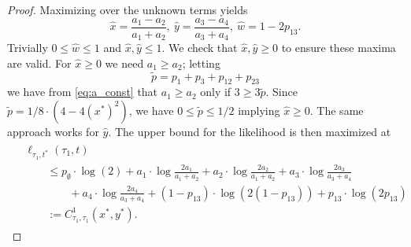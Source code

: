 \begin{proof}
Maximizing over the unknown terms yields
$$
\hat{x} = \frac{a_{1}-a_{2}}{a_{1}+a_{2}}, \ \hat{y} = \frac{a_{3}-a_{4}}{a_{3}+a_{4}}, \ \hat{w} = 1-2p_{13}.
$$
Trivially $0 \le \hat{w} \le 1$ and $\hat{x}, \hat{y} \le 1$.
We check that $\hat{x}, \hat{y} \ge 0$ to ensure these maxima are valid.
For $\hat{x} \ge 0$ we need $a_1 \ge a_2$; letting
$$
\tilde{p} = p_{1}+p_{3}+p_{12}+p_{23}
$$
we have from \eqref{eq:a_const} that $a_1 \ge a_2$ only if $3 \ge 3\tilde{p}$.
Since $\tilde{p} = 1/8\cdot(4-4(x^*)^2)$, we have $0 \le \tilde{p} \le 1/2$ implying $\hat{x} \ge 0$.
The same approach works for $\hat{y}$.
The upper bound for the likelihood is then maximized at
\begin{align}
\begin{split}
&    \ell_{\tau_1,t^*}(\tau_1, t) \\
&\qquad\le      p_{\emptyset}  \cdot\log(2)
+ a_{1}\cdot\log\frac{2a_{1}}{a_{1}+a_{2}}
+ a_{2}\cdot\log\frac{2a_{2}}{a_{1}+a_{2}}
+ a_{3}\cdot\log\frac{2a_{3}}{a_{3}+a_{4}} \\
&\qquad\qquad + a_{4}\cdot\log\frac{2a_{4}}{a_{3}+a_{4}}
+ (1-p_{13})\cdot\log(2(1-p_{13}))
+ p_{13}\cdot\log(2p_{13}) \\
&\qquad := C^{1}_{\tau_1,\tau_1}(x^*, y^*).
\end{split}
\label{eq:farris-upper-bound}
\end{align}


\end{proof}
